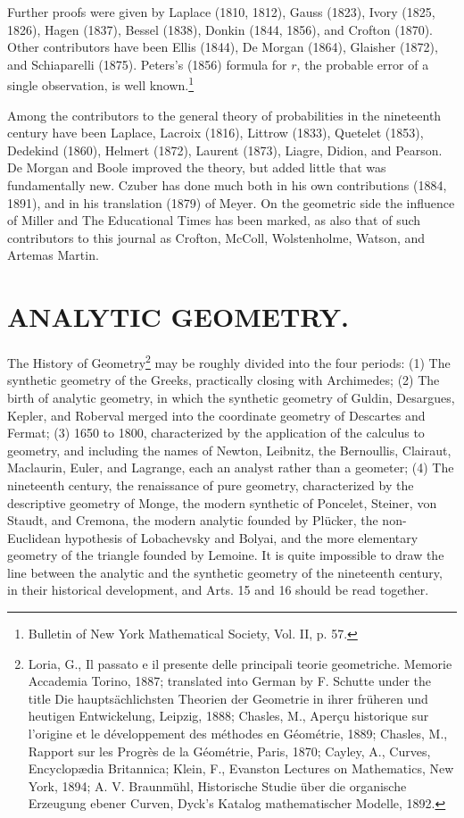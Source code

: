 \documentclass[oneside]{book}
\begin{document}
Further proofs were given by Laplace (1810, 1812), Gauss (1823),
Ivory (1825, 1826), Hagen (1837), Bessel (1838), Donkin (1844,
1856), and Crofton (1870). Other contributors have been Ellis
(1844), De Morgan (1864), Glaisher (1872), and Schiaparelli
(1875). Peters's (1856) formula for $r$, the probable error of a
single observation, is well known.\footnote{Bulletin of New York
Mathematical Society, Vol. II, p. 57.}

Among the contributors to the general theory of probabilities in
the nineteenth century have been Laplace, Lacroix (1816), Littrow
(1833), Quetelet (1853), Dedekind (1860), Helmert (1872), Laurent
(1873), Liagre, Didion, and Pearson. De Morgan and Boole improved
the theory, but added little that was fundamentally new. Czuber has
done much both in his own contributions (1884, 1891), and in his
translation (1879) of Meyer. On the geometric side the influence of
Miller and The Educational Times has been marked, as also that of
such contributors to this journal as Crofton, McColl, Wolstenholme,
Watson, and Artemas Martin.

\chapter{ANALYTIC GEOMETRY.}

The History of Geometry\footnote{Loria, G., Il passato e il presente
delle principali teorie geometriche. Memorie Accademia Torino,
1887; translated into German by F. Schutte under the title Die
haupts\"achlichsten Theorien der Geometrie in ihrer fr\"uheren und
heutigen Entwickelung, Leipzig, 1888; Chasles, M., Aper\c{c}u
historique sur l'origine et le d\'eveloppement des m\'ethodes en
G\'eom\'etrie, 1889; Chasles, M., Rapport sur les Progr\`es de la
G\'eom\'etrie, Paris, 1870; Cayley, A., Curves, Encyclop\ae{}dia
Britannica; Klein, F., Evanston Lectures on Mathematics, New York,
1894; A. V. Braunm\"uhl, Historische Studie \"uber die organische
Erzeugung ebener Curven, Dyck's Katalog mathematischer Modelle,
1892.} may be roughly divided into the four periods: (1) The
synthetic geometry of the Greeks, practically closing with
Archimedes; (2) The birth of analytic geometry, in which the
synthetic geometry of Guldin, Desargues, Kepler, and Roberval merged
into the coordinate geometry of Descartes and Fermat; (3) 1650 to
1800, characterized by the application of the calculus to geometry,
and including the names of Newton, Leibnitz, the Bernoullis,
Clairaut, Maclaurin, Euler, and Lagrange, each an analyst rather
than a geometer; (4) The nineteenth century, the renaissance of pure
geometry, characterized by the descriptive geometry of Monge, the
modern synthetic of Poncelet, Steiner, von Staudt, and Cremona, the
modern analytic founded by Pl\"ucker, the non-Euclidean hypothesis
of Lobachevsky and Bolyai, and the more elementary geometry of the
triangle founded by Lemoine. It is quite impossible to draw the
line between the analytic and the synthetic geometry of the
nineteenth century, in their historical development, and Arts. 15
and 16 should be read together.
\end{document}
